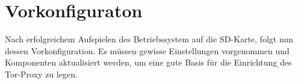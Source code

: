 \section{Vorkonfiguraton}
Nach erfolgreichem Aufspielen des Betriebssystem auf die SD-Karte, folgt nun dessen Vorkonfiguration. Es müssen gewisse Einstellungen vorgenommen und Komponenten aktualisiert werden, um eine gute Basis für die Einrichtung des Tor-Proxy zu legen.


